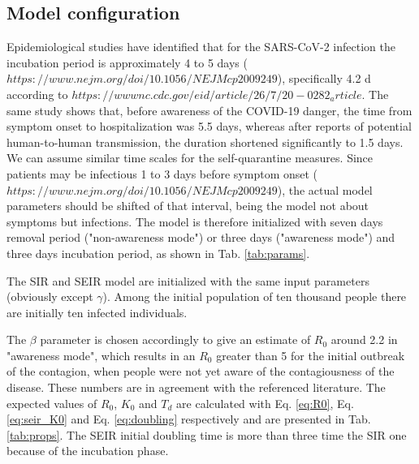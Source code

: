 \documentclass[DIV=12, BCOR=0pt]{scrartcl}  %
\begin{document}
  \subsection{Model configuration}
	Epidemiological studies have identified that for the SARS-CoV-2 infection the incubation period is approximately 4 to 5 days ($https://www.nejm.org/doi/10.1056/NEJMcp2009249$), specifically 4.2 d according to $https://wwwnc.cdc.gov/eid/article/26/7/20-0282_article$. The same study shows that, before awareness of the COVID-19 danger, the time from symptom onset to hospitalization was 5.5 days, whereas after reports of potential human-to-human transmission, the duration shortened significantly to 1.5 days. We can assume similar time scales for the self-quarantine measures. Since patients may be infectious 1 to 3 days before symptom onset ($https://www.nejm.org/doi/10.1056/NEJMcp2009249$), the actual model parameters should be shifted of that interval, being the model not about symptoms but infections. 
  The model is therefore initialized with seven days removal period ("non-awareness mode") or three days ("awareness mode") and three days incubation period, as shown in Tab. \ref{tab:params}. 
  
  
 
  The SIR and SEIR model are initialized with the same input parameters (obviously except $\gamma$). Among the initial population of ten thousand people there are initially ten infected individuals. 
  
  The $\beta$ parameter is chosen accordingly to give an estimate of $R_0$ around 2.2 in "awareness mode", which results in an $R_0$ greater than 5 for the initial outbreak of the contagion, when people were not yet aware of the contagiousness of the disease. These numbers are in agreement with the referenced literature.
  The expected values of $R_0$, $K_0$ and $T_d$ are calculated with Eq. \ref{eq:R0}, Eq. \ref{eq:seir_K0} and Eq. \ref{eq:doubling} respectively and are presented in Tab. \ref{tab:props}. The SEIR initial doubling time is more than three time the SIR one because of the incubation phase.
\end{document}
